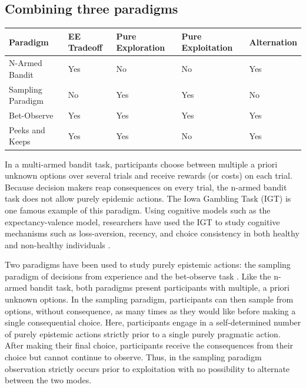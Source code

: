 \documentclass[a4paper,doc,natbib,floatsintext]{apa6}\usepackage[]{graphicx}\usepackage[]{color}
\begin{document}
\subsection{Combining three paradigms}


\begin{center}
    \begin{tabular}{ | l | l | l | l | l |}
    \hline
    Paradigm & EE Tradeoff & Pure Exploration & Pure Exploitation & Alternation \\ \hline
    N-Armed Bandit & Yes & No & No & Yes\\ \hline
    Sampling Paradigm & No & Yes & Yes & No\\ \hline
    Bet-Observe & Yes & Yes & Yes & Yes\\ \hline
    Peeks and Keeps & Yes & Yes & No & Yes\\ \hline
    \hline
    \end{tabular}
\end{center}


In a multi-armed bandit task, participants choose between multiple a priori unknown options over several trials and receive rewards (or costs) on each trial. Because decision makers reap consequences on every trial, the n-armed bandit task does not allow purely epidemic actions. The Iowa Gambling Task (IGT) is one famous example of this paradigm. Using cognitive models such as the expectancy-valence model, researchers have used the IGT to study cognitive mechanisms such as loss-aversion, recency, and choice consistency in both healthy and non-healthy individuals \citep{yechiam2005models}.

Two paradigms have been used to study purely epistemic actions: the sampling paradigm of decisions from experience \citep{hertwig2004decisions} and the bet-observe task \citep{tversky1966information}. Like the n-armed bandit task, both paradigms present participants with multiple, a priori unknown options. In the sampling paradigm, participants can then sample from options, without consequence, as many times as they would like before making a single consequential choice. Here, participants engage in a self-determined number of purely epistemic actions strictly prior to a single purely pragmatic action. After making their final choice, participants receive the consequences from their choice but cannot continue to observe. Thus, in the sampling paradigm observation strictly occurs prior to exploitation with no possibility to alternate between the two modes.
\end{document}
